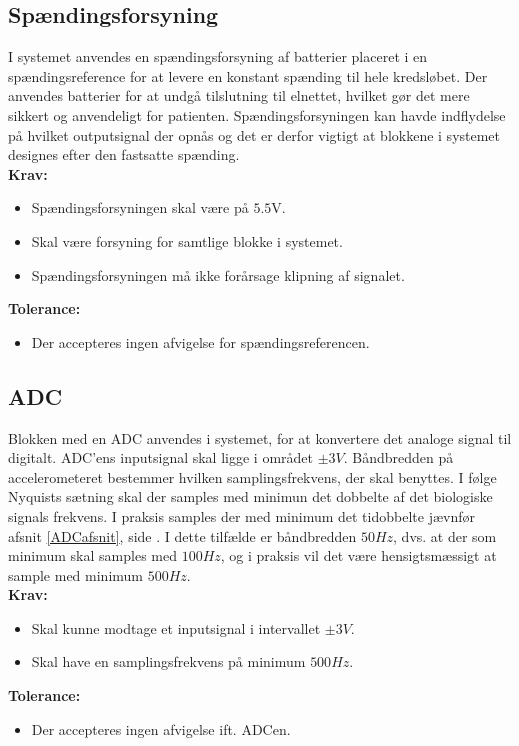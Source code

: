 \subsection{Spændingsforsyning}
I systemet anvendes en spændingsforsyning af batterier placeret i en spændingsreference for at levere en konstant spænding til hele kredsløbet. Der anvendes batterier for at undgå tilslutning til elnettet, hvilket gør det mere sikkert og anvendeligt for patienten. Spændingsforsyningen kan havde indflydelse på hvilket outputsignal der opnås og det er derfor vigtigt at blokkene i systemet designes efter den fastsatte spænding. \\
\noindent\textbf{Krav:}
\begin{itemize}
\item Spændingsforsyningen skal være på $5.5$V.
\item Skal være forsyning for samtlige blokke i systemet.
\item Spændingsforsyningen må ikke forårsage klipning af signalet.
\end{itemize}
\noindent\textbf{Tolerance:}
\begin{itemize}
\item Der accepteres ingen afvigelse for spændingsreferencen.
\end{itemize}

\subsection{ADC}
Blokken med en ADC anvendes i systemet, for at konvertere det analoge signal til digitalt. %
ADC'ens inputsignal skal ligge i området $\pm3V$. Båndbredden på accelerometeret bestemmer hvilken samplingsfrekvens, der skal benyttes. I følge Nyquists sætning skal der samples med minimun det dobbelte af det biologiske signals frekvens. I praksis samples der med minimum det tidobbelte jævnfør afsnit \ref{ADCafsnit}, side \pageref{ADCafsnit}. I dette tilfælde er båndbredden $50Hz$, dvs. at der som minimum skal samples med $100Hz$, og i praksis vil det være hensigtsmæssigt at sample med minimum $500Hz$. \\
\textbf{Krav:}
\begin{itemize}
	\item Skal kunne modtage et inputsignal i intervallet $\pm 3 V$.
	\item Skal have en samplingsfrekvens på minimum $500Hz$.
\end{itemize}
\textbf{Tolerance:}
\begin{itemize}
	\item Der accepteres ingen afvigelse ift. ADCen.
\end{itemize}
